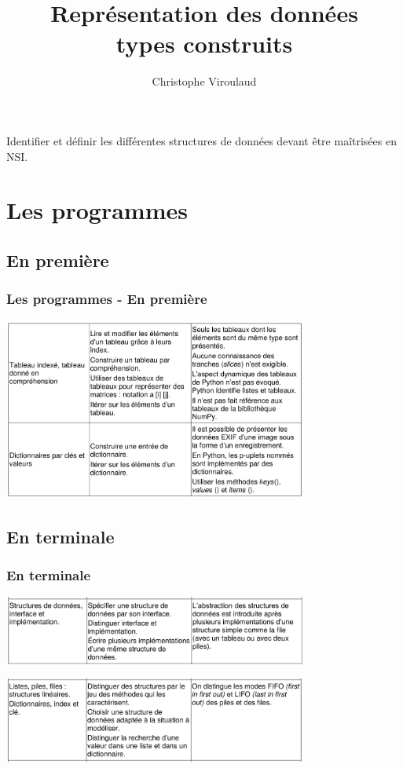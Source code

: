 \documentclass[svgnames,11pt]{beamer}
\author[]{Christophe Viroulaud}
\title{Représentation des données \\ types construits}
\date{\framebox{\textbf{NSI}}}
\institute{Formation NSI}
\begin{document}
\begin{frame}
    \titlepage
\end{frame}
\begin{frame}
    \frametitle{}

    \begin{framed}
        \centering Identifier et définir les différentes structures de données devant être maîtrisées en NSI.
    \end{framed}

\end{frame}
\section{Les programmes}
\subsection{En première}
\begin{frame}
    \frametitle{Les programmes - En première}

    \begin{center}
        \includegraphics[width=10cm]{ressources/premiere.png}
    \end{center}

\end{frame}
\subsection{En terminale}
\begin{frame}
    \frametitle{En terminale}

    \begin{center}
        \includegraphics[width=10cm]{ressources/terminale1.png}
    \end{center}
    \begin{center}
        \includegraphics[width=10cm]{ressources/terminale2.png}
    \end{center}

\end{frame}
\end{document}
